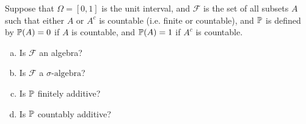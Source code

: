 \begin{problem}
	\label{prob:countableAdditivityOfProbabilityOnSigmaAlg}
	Suppose that $ \Omega =[0,1] $ is the unit interval, and $ \mathcal{F} $ is the set of all subsets $ A $ such that either $ A $ or $ A^c $ is countable (i.e. finite or countable), and $ \mathbb{P} $ is defined by $ \mathbb{P}(A) =0 $ if $ A $ is countable, and $ \mathbb{P}(A) = 1 $ if $ A^c $ is countable.
	\begin{enumerate}[(a)]
		\item Is $ \mathcal{F} $ an algebra?
		\item Is $ \mathcal{F} $ a $\sigma\text{-algebra}$?
		\item Is $ \mathbb{P} $ finitely additive?
		\item Is $ \mathbb{P} $ countably additive?
	\end{enumerate}
\end{problem}
